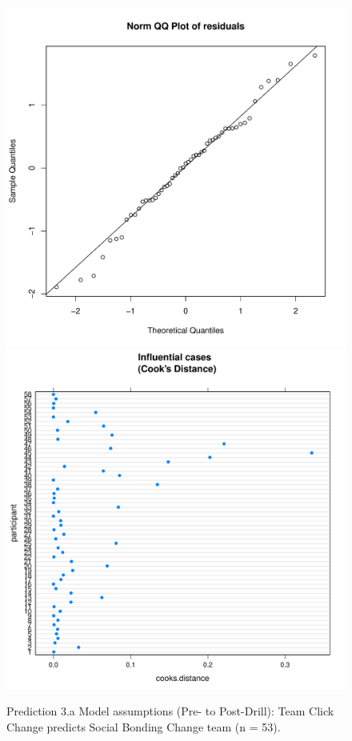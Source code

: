 \begin{CJK}{UTF8}{gbsn}
\begin{figure}[htbp]
    \includegraphics[scale =.4]{images/TEM22TeamQQNorm.pdf}
    \includegraphics[scale =.4]{images/TEM22TeamCooksD.pdf}
    \caption{Prediction 3.a Model assumptions (Pre- to Post-Drill): Team Click Change predicts Social Bonding Change team (n = 53).}
    \label{fig:M22aAssumptions}
\end{figure}






\end{CJK}
